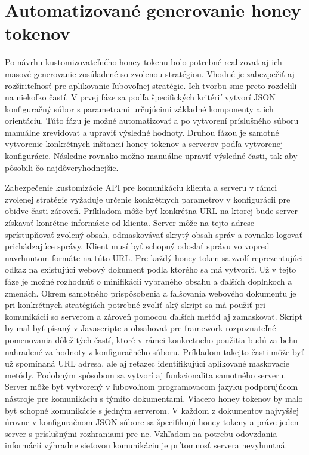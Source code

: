 \documentclass[conference, 11pt,slovak,a4paper,twoside]{IEEEtran}
\begin{document}
\section{Automatizované generovanie honey tokenov}

Po návrhu kustomizovateľného honey tokenu bolo potrebné realizovať aj ich masové generovanie zosúladené so zvolenou stratégiou. Vhodné je zabezpečiť aj rozšíriteľnosť pre aplikovanie ľubovoľnej stratégie. Ich tvorbu sme preto rozdelili na niekoľko častí. V prvej fáze sa podľa špecifických kritérií vytvorí JSON konfiguračný súbor s parametrami určujúcimi základné komponenty a ich orientáciu. Túto fázu je možné automatizovať a po vytvorení príslušného súboru manuálne zrevidovať a upraviť výsledné hodnoty. Druhou fázou je samotné vytvorenie konkrétnych inštancií honey tokenov a serverov podľa vytvorenej konfigurácie. Následne rovnako možno manuálne upraviť výsledné časti, tak aby pôsobili čo najdôveryhodnejšie.

Zabezpečenie kustomizácie API pre komunikáciu klienta a serveru v rámci zvolenej stratégie vyžaduje určenie konkrétnych parametrov v konfigurácii pre obidve časti zároveň. Príkladom môže byť konkrétna URL na ktorej bude server získavať konrétne informácie od klienta. Server môže na tejto adrese sprístupňovať zvolený obsah, odmaskovávať skrytý obsah správ a rovnako logovať prichádzajúce správy. Klient musí byť schopný odoslať správu vo vopred navrhnutom formáte na túto URL. Pre každý honey token sa zvolí reprezentujúci odkaz na existujúci webový dokument podľa ktorého sa má vytvoriť. Už v tejto fáze je možné rozhodnúť o minifikácii vybraného obsahu a ďalších doplnkoch a zmenách. Okrem samotného prispôsobenia a falšovania webového dokumentu je pri konkrétnych stratégiách potrebné zvoliť aký skript sa má použiť pri komunikácii so serverom a zároveň pomocou ďalších metód aj zamaskovať. Skript by mal byť písaný v Javascripte a obsahovať pre framework rozpoznateľné pomenovania dôležitých častí, ktoré v rámci konkretneho použitia budú za behu nahradené za hodnoty z konfiguračného súboru. Príkladom takejto časti môže byť už spomínaná URL adresa, ale aj reťazec identifikujúci aplikované maskovacie metódy. Podobným spôsobom sa vytvorí aj funkcionalita samotného serveru. Server môže byť vytvorený v ľubovoľnom programovacom jazyku podporujúcom nástroje pre komunikáciu s týmito dokumentami. Viacero honey tokenov by malo byť schopné komunikácie s jedným serverom. V každom z dokumentov najvyššej úrovne v konfiguračnom JSON súbore sa špecifikujú honey tokeny a práve jeden server s príslušnými rozhraniami pre ne. Vzhľadom na potrebu odovzdania informácií výhradne sieťovou komunikáciu je prítomnosť servera nevyhnutná. 
\end{document}

